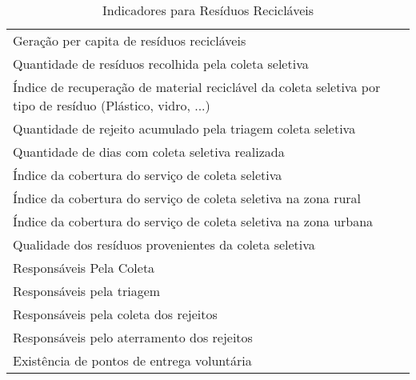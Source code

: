 \begin{table}[h!]
  \centering
  \caption{Indicadores para Resíduos Recicláveis}
    \begin{tabular}{|p{27.145em}|}
    \rowcolor[rgb]{ .984,  .831,  .706} \multicolumn{1}{p{27.145em}}{RESÍDUOS SÓLIDOS URBANOS RECICLÁVEIS (COLETA SELETIVA)} \\
    \midrule
    Geração per capita de resíduos recicláveis \\
    \midrule
    Quantidade de resíduos recolhida pela coleta seletiva \\
    \midrule
    Índice de recuperação de material reciclável da coleta seletiva por tipo de resíduo (Plástico, vidro, ...) \\
    \midrule
    Quantidade de rejeito acumulado pela triagem coleta seletiva \\
    \midrule
    Quantidade de dias com coleta seletiva realizada \\
    \midrule
    Índice da cobertura do serviço de coleta seletiva \\
    \midrule
    Índice da cobertura do serviço de coleta seletiva na zona rural \\
    \midrule
    Índice da cobertura do serviço de coleta seletiva na zona urbana \\
    \midrule
    Qualidade dos resíduos provenientes da coleta seletiva \\
    \midrule
    Responsáveis Pela Coleta \\
    \midrule
    Responsáveis pela triagem \\
    \midrule
    Responsáveis pela coleta dos rejeitos  \\
    \midrule
    Responsáveis pelo aterramento dos rejeitos \\
    \midrule
    Existência de pontos de entrega voluntária \\
    \bottomrule
    \end{tabular}%
  \label{tab:ind_reciclaveis}%
\end{table}%

